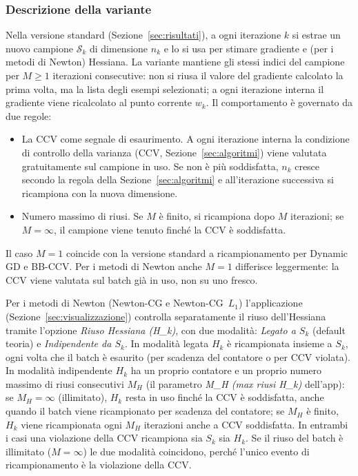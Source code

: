 \documentclass[a4paper,12pt]{article}
\numberwithin{equation}{section}
\numberwithin{figure}{section}
\numberwithin{table}{section}
\begin{document}
\subsubsection{Descrizione della variante}\label{app:riuso-descrizione}

Nella versione standard (Sezione~\ref{sec:risultati}), a ogni iterazione $k$
si estrae un nuovo campione $\mathcal{S}_k$ di dimensione $n_k$ e lo si usa
per stimare gradiente e (per i metodi di Newton) Hessiana. La variante
mantiene gli stessi indici del campione per $M \ge 1$ iterazioni
consecutive: non si riusa il valore del gradiente calcolato la prima volta,
ma la lista degli esempi selezionati; a ogni iterazione interna il gradiente
viene ricalcolato al punto corrente $w_k$. Il comportamento è governato da
due regole:

\begin{itemize}
\item La CCV come segnale di esaurimento. A ogni iterazione interna
  la condizione di controllo della varianza (CCV, Sezione~\ref{sec:algoritmi})
  viene valutata gratuitamente sul campione in uso. Se non è più
  soddisfatta, $n_k$ cresce secondo la regola della Sezione~\ref{sec:algoritmi}
  e all'iterazione successiva si ricampiona con la nuova dimensione.
\item Numero massimo di riusi. Se $M$ è finito, si ricampiona dopo
  $M$ iterazioni; se $M = \infty$, il campione viene tenuto finché la CCV è
  soddisfatta.
\end{itemize}

Il caso $M = 1$ coincide con la versione standard a ricampionamento per
Dynamic GD e BB-CCV. Per i metodi di Newton anche $M = 1$ differisce
leggermente: la CCV viene valutata sul batch già in uso, non su uno fresco.

Per i metodi di Newton (Newton-CG e Newton-CG~$L_1$) l'applicazione
(Sezione~\ref{sec:visualizzazione}) controlla separatamente il riuso
dell'Hessiana tramite l'opzione \emph{Riuso Hessiana (H\_k)}, con due
modalità: \emph{Legato a $S_k$} (default teoria) e \emph{Indipendente da
$S_k$}. In modalità legata $H_k$ è ricampionata insieme a $S_k$, ogni volta
che il batch è esaurito (per scadenza del contatore o per CCV violata). In
modalità indipendente $H_k$ ha un proprio contatore e un proprio numero
massimo di riusi consecutivi $M_H$ (il parametro \emph{M\_H (max riusi H\_k)}
dell'app): se $M_H = \infty$ (illimitato), $H_k$ resta in uso finché la CCV è
soddisfatta, anche quando il batch viene ricampionato per scadenza del
contatore; se $M_H$ è finito, $H_k$ viene ricampionata ogni $M_H$ iterazioni
anche a CCV soddisfatta. In entrambi i casi una violazione della CCV
ricampiona sia $S_k$ sia $H_k$. Se il riuso del batch è illimitato
($M = \infty$) le due modalità coincidono, perché l'unico evento di
ricampionamento è la violazione della CCV.
\end{document}
